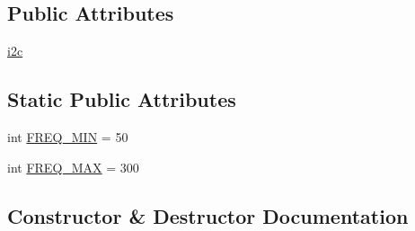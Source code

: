 \subsection*{Public Attributes}
\begin{DoxyCompactItemize}
\item 
\hyperlink{classdriver_1_1DRIVER__CORE_1_1PCA9865_a3a4b2748c61f79822d6602c941535bd2}{i2c}
\end{DoxyCompactItemize}
\subsection*{Static Public Attributes}
\begin{DoxyCompactItemize}
\item 
int \hyperlink{classdriver_1_1DRIVER__CORE_1_1PCA9865_ad9aef9648195aa00f5ae496992073930}{F\+R\+E\+Q\+\_\+\+M\+I\+N} = 50
\item 
int \hyperlink{classdriver_1_1DRIVER__CORE_1_1PCA9865_a5394eec714130c246fe47c35a2af683a}{F\+R\+E\+Q\+\_\+\+M\+A\+X} = 300
\end{DoxyCompactItemize}


\subsection{Constructor \& Destructor Documentation}
\hypertarget{classdriver_1_1DRIVER__CORE_1_1PCA9865_ae727575a3372b8b4d90ffa314081c489}{}

